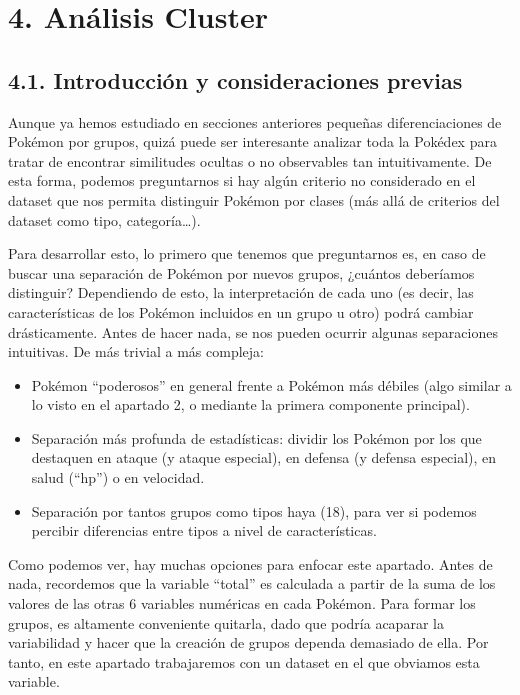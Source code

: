 \documentclass[
  12pt,
]{extreport}
\begin{document}
\chapter{4. Análisis Cluster}\label{anuxe1lisis-cluster}

\section{4.1. Introducción y consideraciones
previas}\label{introducciuxf3n-y-consideraciones-previas}

Aunque ya hemos estudiado en secciones anteriores pequeñas
diferenciaciones de Pokémon por grupos, quizá puede ser interesante
analizar toda la Pokédex para tratar de encontrar similitudes ocultas o
no observables tan intuitivamente. De esta forma, podemos preguntarnos
si hay algún criterio no considerado en el dataset que nos permita
distinguir Pokémon por clases (más allá de criterios del dataset como
tipo, categoría\ldots).

Para desarrollar esto, lo primero que tenemos que preguntarnos es, en
caso de buscar una separación de Pokémon por nuevos grupos, ¿cuántos
deberíamos distinguir? Dependiendo de esto, la interpretación de cada
uno (es decir, las características de los Pokémon incluidos en un grupo
u otro) podrá cambiar drásticamente. Antes de hacer nada, se nos pueden
ocurrir algunas separaciones intuitivas. De más trivial a más compleja:

\begin{itemize}
\item
  Pokémon ``poderosos'' en general frente a Pokémon más débiles (algo
  similar a lo visto en el apartado 2, o mediante la primera componente
  principal).
\item
  Separación más profunda de estadísticas: dividir los Pokémon por los
  que destaquen en ataque (y ataque especial), en defensa (y defensa
  especial), en salud (``hp'') o en velocidad.
\item
  Separación por tantos grupos como tipos haya (18), para ver si podemos
  percibir diferencias entre tipos a nivel de características.
\end{itemize}

Como podemos ver, hay muchas opciones para enfocar este apartado. Antes
de nada, recordemos que la variable ``total'' es calculada a partir de
la suma de los valores de las otras 6 variables numéricas en cada
Pokémon. Para formar los grupos, es altamente conveniente quitarla, dado
que podría acaparar la variabilidad y hacer que la creación de grupos
dependa demasiado de ella. Por tanto, en este apartado trabajaremos con
un dataset en el que obviamos esta variable.
\end{document}
